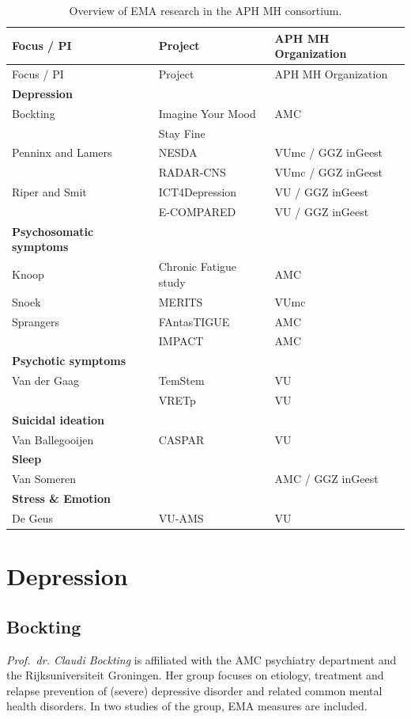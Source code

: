 \documentclass[]{book}
\begin{document}
\begin{longtable}[]{@{}lll@{}}
\caption{\label{tab:APHresearch} Overview of EMA research in the APH MH
consortium.}\tabularnewline
\toprule
Focus / PI & Project & APH MH Organization\tabularnewline
\midrule
\endfirsthead
\toprule
Focus / PI & Project & APH MH Organization\tabularnewline
\midrule
\endhead
\textbf{Depression} & &\tabularnewline
Bockting & Imagine Your Mood & AMC\tabularnewline
& Stay Fine &\tabularnewline
Penninx and Lamers & NESDA & VUmc / GGZ inGeest\tabularnewline
& RADAR-CNS & VUmc / GGZ inGeest\tabularnewline
Riper and Smit & ICT4Depression & VU / GGZ inGeest\tabularnewline
& E-COMPARED & VU / GGZ inGeest\tabularnewline
\textbf{Psychosomatic symptoms} & &\tabularnewline
Knoop & Chronic Fatigue study & AMC\tabularnewline
Snoek & MERITS & VUmc\tabularnewline
Sprangers & FAntasTIGUE & AMC\tabularnewline
& IMPACT & AMC\tabularnewline
\textbf{Psychotic symptoms} & &\tabularnewline
Van der Gaag & TemStem & VU\tabularnewline
& VRETp & VU\tabularnewline
\textbf{Suicidal ideation} & &\tabularnewline
Van Ballegooijen & CASPAR & VU\tabularnewline
\textbf{Sleep} & &\tabularnewline
Van Someren & & AMC / GGZ inGeest\tabularnewline
\textbf{Stress \& Emotion} & &\tabularnewline
De Geus & VU-AMS & VU\tabularnewline
\bottomrule
\end{longtable}

\section{Depression}\label{depression}

\subsection{Bockting}\label{bockting}

   

\emph{Prof.~dr. Claudi Bockting} is affiliated with the AMC psychiatry
department and the Rijksuniversiteit Groningen. Her group focuses on
etiology, treatment and relapse prevention of (severe) depressive
disorder and related common mental health disorders. In two studies of
the group, EMA measures are included.
\end{document}
